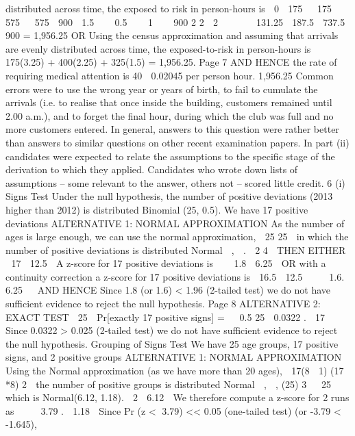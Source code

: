 \documentclass[a4paper,12pt]{article}
\begin{document}
\begin{enumerate}
distributed across time,
the exposed to risk in person-hours is
 0  175 
 175  575   575  900 
1.5 
  0.5 
  1 
  900
2
2
 2 

 

 131.25  187.5  737.5  900
= 1,956.25
OR
Using the census approximation and assuming that arrivals are evenly
distributed across time,
the exposed-to-risk in person-hours is
175(3.25) + 400(2.25) + 325(1.5) = 1,956.25.
Page 7 %
AND HENCE
the rate of requiring medical attention is
40
 0.02045 per person hour.
1,956.25
Common errors were to use the wrong year or years of birth, to fail to cumulate the arrivals
(i.e. to realise that once inside the building, customers remained until 2.00 a.m.), and to
forget the final hour, during which the club was full and no more customers entered. In
general, answers to this question were rather better than answers to similar questions on
other recent examination papers. In part (ii) candidates were expected to relate the
assumptions to the specific stage of the derivation to which they applied. Candidates who
wrote down lists of assumptions – some relevant to the answer, others not – scored little
credit.
6
(i)
Signs Test
Under the null hypothesis, the number of positive deviations (2013 higher than
2012) is distributed Binomial (25, 0.5).
We have 17 positive deviations
ALTERNATIVE 1: NORMAL APPROXIMATION
As the number of ages is large enough, we can use the normal approximation,
 25 25 
in which the number of positive deviations is distributed Normal  ,  .
 2 4 
THEN EITHER
 17  12.5 
A z-score for 17 positive deviations is 
  1.8
 6.25 
OR
with a continuity correction a z-score for 17 positive deviations is
 16.5  12.5 

  1.6.
6.25 

AND HENCE
Since 1.8 (or 1.6) < 1.96 (2-tailed test)
we do not have sufficient evidence to reject the null hypothesis.
Page 8 %
ALTERNATIVE 2: EXACT TEST
 25 
Pr[exactly 17 positive signs] =   0.5 25  0.0322 .
 17 
Since 0.0322 > 0.025 (2-tailed test)
we do not have sufficient evidence to reject the null hypothesis.
Grouping of Signs Test
We have 25 age groups, 17 positive signs, and 2 positive groups
ALTERNATIVE 1: NORMAL APPROXIMATION
Using the Normal approximation (as we have more than 20 ages),
 17(8  1) (17 *8) 2 
the number of positive groups is distributed Normal 
,
 ,
(25) 3 
 25
which is Normal(6.12, 1.18).
 2  6.12 
We therefore compute a z-score for 2 runs as 
   3.79 .
 1.18 
Since Pr (z < 3.79) << 0.05 (one-tailed test) (or -3.79 < -1.645),

\end{enumerate}
\end{document}
